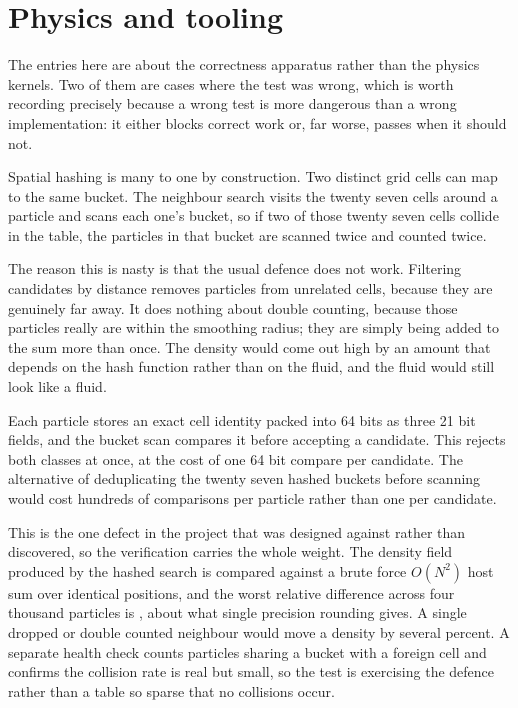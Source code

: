\chapter{Physics and tooling}

The entries here are about the correctness apparatus rather than the physics
kernels. Two of them are cases where the test was wrong, which is worth recording precisely because a wrong test is more dangerous than
a wrong implementation: it either blocks correct work or, far worse, passes
when it should not.


 Spatial hashing is many to one by construction. Two
distinct grid cells can map to the same bucket. The neighbour search visits the
twenty seven cells around a particle and scans each one's bucket, so if two of
those twenty seven cells collide in the table, the particles in that bucket are
scanned twice and counted twice.

The reason this is nasty is that the usual defence does not work. Filtering
candidates by distance removes particles from unrelated cells, because they are
genuinely far away. It does nothing about double counting, because those
particles really are within the smoothing radius; they are simply being added
to the sum more than once. The density would come out high by an amount that
depends on the hash function rather than on the fluid, and the fluid would
still look like a fluid.

 Each particle stores an exact cell identity packed into 64
bits as three 21 bit fields, and the bucket scan compares it before accepting a
candidate. This rejects both classes at once, at the cost of one 64 bit compare
per candidate. The alternative of deduplicating the twenty seven hashed buckets
before scanning would cost hundreds of comparisons per particle rather than
one per candidate.

 This is the one defect in the project that was designed
against rather than discovered, so the verification carries the whole weight.
The density field produced by the hashed search is compared against a brute
force $O(N^2)$ host sum over identical positions, and the worst relative
difference across four thousand particles is \NeighbourSearchError{}, about what single
precision rounding gives. A single dropped or double counted neighbour
would move a density by several percent. A separate health check counts
particles sharing a bucket with a foreign cell and confirms the collision rate
is real but small, so the test is exercising the defence rather than a table so
sparse that no collisions occur.

